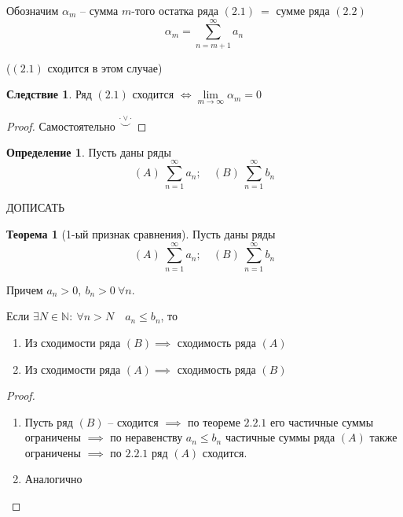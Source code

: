 \documentclass{report}
\theoremstyle{definition}
\newtheorem{definition}{Определение}[section]
\newtheorem*{effect}{Следствие}
\newtheorem{theorem}{Теорема}[section]
\begin{document}
Обозначим $\alpha_m$ -- сумма $m$-того остатка ряда $(2.1) \ =$ сумме ряда $(2.2)$
\begin{equation*}
  \alpha_m = \sum_{n=m+1}^{\infty}a_n
\end{equation*}
\begin{center}
  ($(2.1)$ сходится в этом случае)
\end{center}

\begin{effect}
  Ряд $(2.1)$ сходится $\iff \underset{m\rightarrow\infty}{\lim} \alpha_m = 0$
\end{effect}

\begin{proof}
  Самостоятельно $\overset{\cdot \lor \cdot}{\smile}$
\end{proof}

\begin{definition}
  Пусть даны ряды
  \begin{equation*}
    (A) \ \sum_{n=1}^{\infty}a_n; \quad (B) \ \sum_{n=1}^{\infty}b_n
  \end{equation*}

  ДОПИСАТЬ
\end{definition}

\begin{theorem}[1-ый признак сравнения]
  Пусть даны ряды
  \begin{equation*}
    (A) \ \sum_{n=1}^{\infty}a_n; \quad (B) \ \sum_{n=1}^{\infty}b_n
  \end{equation*}

  Причем $a_n > 0, \ b_n > 0 \ \forall n$.

  Если $\exists N \in \mathbb{N}: \ \forall n > N \quad a_n \leqslant b_n$, то
  \begin{enumerate}
    \item Из сходимости ряда $(B) \implies$ сходимость ряда $(A)$
    \item Из сходимости ряда $(A) \implies$ сходимость ряда $(B)$
  \end{enumerate}
\end{theorem}

\begin{proof}
  \begin{enumerate}
    \item Пусть ряд $(B)$ -- сходится $\implies$ по теореме $2.2.1$ его частичные суммы ограничены $\implies$ по неравенству $a_n\leqslant b_n$ частичные суммы ряда $(A)$ также ограничены $\implies$ по $2.2.1$ ряд $(A)$ сходится.
    \item Аналогично
  \end{enumerate}
\end{proof}
\end{document}
